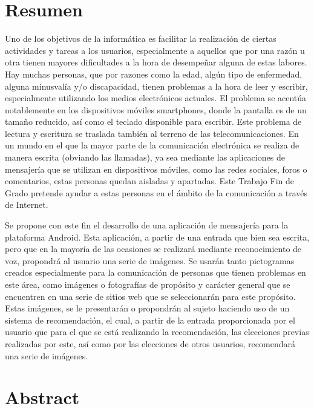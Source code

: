 \chapter{Resumen}

Uno de los objetivos de la informática es facilitar la realización de ciertas actividades y tareas a los usuarios, especialmente a aquellos que por una razón u otra tienen mayores dificultades a la hora de desempeñar alguna de estas labores. Hay muchas personas, que por razones como la edad, algún tipo de enfermedad, alguna minusvalía y/o discapacidad, tienen problemas a la hora de leer y escribir, especialmente utilizando los medios electrónicos actuales. El problema se acentúa notablemente en los dispositivos móviles smartphones, donde la pantalla es de un tamaño reducido, así como el teclado disponible para escribir. Este problema de lectura y escritura se traslada también al terreno de las telecomunicaciones. En un mundo en el que la mayor parte de la comunicación electrónica se realiza de manera escrita (obviando las llamadas), ya sea mediante las aplicaciones de mensajería que se utilizan en dispositivos móviles, como las redes sociales, foros o comentarios, estas personas quedan aisladas y apartadas.  Este Trabajo Fin de Grado pretende ayudar a estas personas en el ámbito de la comunicación a través de Internet.


Se propone con este fin el desarrollo de una aplicación de mensajería para la plataforma Android. Esta aplicación, a partir de una entrada que bien sea escrita, pero que en la mayoría de las ocasiones se realizará mediante reconocimiento de voz, propondrá al usuario una serie de imágenes. Se usarán tanto pictogramas creados especialmente para la comunicación de personas que tienen problemas en este área, como imágenes o fotografías de propósito y carácter general que se encuentren en una serie de sitios web que se seleccionarán para este propósito. Estas imágenes, se le presentarán o propondrán al sujeto haciendo uso de un sistema de recomendación, el cual, a partir de la entrada proporcionada por el usuario que para el que se está realizando la recomendación, las elecciones previas realizadas por este, así como por las elecciones de otros usuarios, recomendará una serie de imágenes.


\chapter{Abstract}

